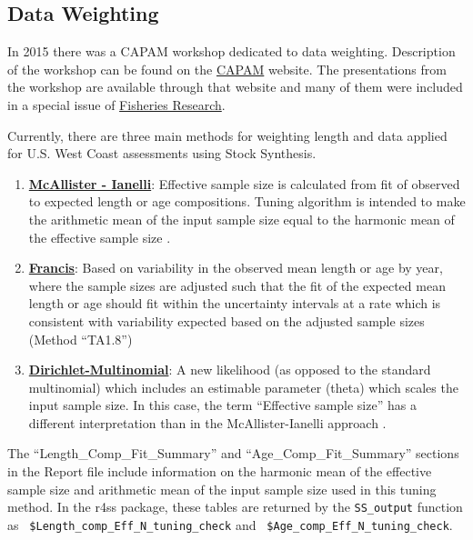 \subsection{Data Weighting}
\label{sec:DataWeight}
\hypertarget{DataWeight}{}


In 2015 there was a CAPAM workshop dedicated to data weighting. Description of the workshop can be found on the \href{http://capamresearch.org/data-weighting/workshop}{CAPAM} website. The presentations from the workshop are available through that website and many of them were included in a special issue of \href{https://sciencedirect.com/journal/fisheries-research/vol/192}{Fisheries Research}.

Currently, there are three main methods for weighting length and data applied for U.S. West Coast assessments using Stock Synthesis.

\begin{enumerate}
	\item \hyperlink{MI}{\textbf{McAllister - Ianelli}}: Effective sample size is calculated from fit of observed to expected length or age compositions. Tuning algorithm is intended to make the arithmetic mean of the input sample size equal to the harmonic mean of the effective sample size \citep{mcallister-bayesian-1997}.
	
	\item \hyperlink{Francis}{\textbf{Francis}}: Based on variability in the observed mean length or age by year, where the sample sizes are adjusted such that the fit of the expected mean length or age should fit within the uncertainty intervals at a rate which is consistent with variability expected based on the adjusted sample sizes (Method ``TA1.8'') \citep{francis-data-2011}
	
	\item \hyperlink{DM}{\textbf{Dirichlet-Multinomial}}: A new likelihood (as opposed to the standard multinomial) which includes an estimable parameter (theta) which scales the input sample size. In this case, the term ``Effective sample size'' has a different interpretation than in the McAllister-Ianelli approach \citep{thorson-model-based-2017}.
\end{enumerate}


\hypertarget{MI}{}
The ``Length\_Comp\_Fit\_Summary'' and ``Age\_Comp\_Fit\_Summary'' sections in the Report file include information on the harmonic mean of the effective sample size and arithmetic mean of the input sample size used in this tuning method. In the r4ss package, these tables are returned by the \texttt{SS\_output} function as \texttt{ \$Length\_comp\_Eff\_N\_tuning\_check} and \texttt{ \$Age\_comp\_Eff\_N\_tuning\_check}.

